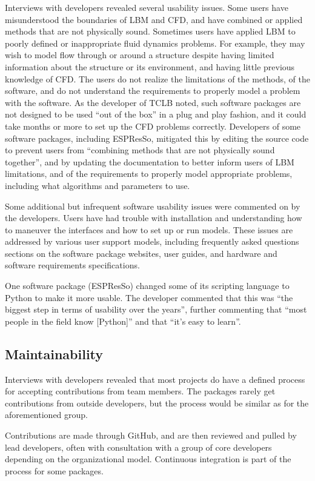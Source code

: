 \documentclass[12pt, notitlepage]{article}
\begin{document}
Interviews with developers revealed several usability issues. Some users have misunderstood the boundaries of LBM and CFD, and have combined or applied methods that are not physically sound. Sometimes users have applied LBM to poorly defined or inappropriate fluid dynamics problems. For example, they may wish to model flow through or around a structure despite having limited information about the structure or its environment, and having little previous knowledge of CFD. The users do not realize the limitations of the methods, of the software, and do not understand the requirements to properly model a problem with the software. As the developer of TCLB noted, such software packages are not designed to be used ``out of the box'' in a plug and play fashion, and it could take months or more to set up the CFD problems correctly. Developers of some software packages, including ESPResSo, mitigated this by editing the source code to prevent users from ``combining methods that are not physically sound together'', and by updating the documentation to better inform users of LBM limitations, and of the requirements to properly model appropriate problems, including what algorithms and parameters to use. 

Some additional but infrequent software usability issues were commented on by the developers. Users have had trouble with installation and understanding how to maneuver the interfaces and how to set up or run models. These issues are addressed by various user support models, including frequently asked questions sections on the software package websites, user guides, and hardware and software requirements specifications.

One software package (ESPResSo) changed some of its scripting language to Python to make it more usable. The developer commented that this was ``the biggest step in terms of usability over the years'', further commenting that ``most people in the field know [Python]'' and that ``it's easy to learn''. 

\subsection{Maintainability}

Interviews with developers revealed that most projects do have a defined process for accepting contributions from team members. The packages rarely get contributions from outside developers, but the process would be similar as for the aforementioned group.

Contributions are made through GitHub, and are then reviewed and pulled by lead developers, often with consultation with a group of core developers depending on the organizational model. Continuous integration is part of the process for some packages. 
\end{document}
